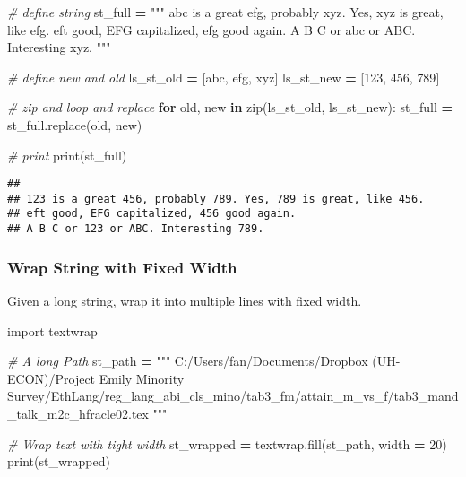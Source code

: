 \documentclass[
]{book}
\newenvironment{Shaded}{\begin{snugshade}}{\end{snugshade}}
\newcommand{\BuiltInTok}[1]{#1}
\newcommand{\CommentTok}[1]{\textcolor[rgb]{0.56,0.35,0.01}{\textit{#1}}}
\newcommand{\ControlFlowTok}[1]{\textcolor[rgb]{0.13,0.29,0.53}{\textbf{#1}}}
\newcommand{\DecValTok}[1]{\textcolor[rgb]{0.00,0.00,0.81}{#1}}
\newcommand{\ImportTok}[1]{#1}
\newcommand{\KeywordTok}[1]{\textcolor[rgb]{0.13,0.29,0.53}{\textbf{#1}}}
\newcommand{\NormalTok}[1]{#1}
\newcommand{\OperatorTok}[1]{\textcolor[rgb]{0.81,0.36,0.00}{\textbf{#1}}}
\newcommand{\StringTok}[1]{\textcolor[rgb]{0.31,0.60,0.02}{#1}}
\begin{document}
\begin{Shaded}
\begin{Highlighting}[]
\CommentTok{\# define string}
\NormalTok{st\_full }\OperatorTok{=} \StringTok{"""}
\StringTok{abc is a great efg, probably xyz. Yes, xyz is great, like efg. }
\StringTok{eft good, EFG capitalized, efg good again. }
\StringTok{A B C or abc or ABC. Interesting xyz. }
\StringTok{"""}

\CommentTok{\# define new and old}
\NormalTok{ls\_st\_old }\OperatorTok{=}\NormalTok{ [}\StringTok{\textquotesingle{}abc\textquotesingle{}}\NormalTok{, }\StringTok{\textquotesingle{}efg\textquotesingle{}}\NormalTok{, }\StringTok{\textquotesingle{}xyz\textquotesingle{}}\NormalTok{]}
\NormalTok{ls\_st\_new }\OperatorTok{=}\NormalTok{ [}\StringTok{\textquotesingle{}123\textquotesingle{}}\NormalTok{, }\StringTok{\textquotesingle{}456\textquotesingle{}}\NormalTok{, }\StringTok{\textquotesingle{}789\textquotesingle{}}\NormalTok{]}

\CommentTok{\# zip and loop and replace}
\ControlFlowTok{for}\NormalTok{ old, new }\KeywordTok{in} \BuiltInTok{zip}\NormalTok{(ls\_st\_old, ls\_st\_new):}
\NormalTok{  st\_full }\OperatorTok{=}\NormalTok{ st\_full.replace(old, new)}

\CommentTok{\# print}
\BuiltInTok{print}\NormalTok{(st\_full)}
\end{Highlighting}
\end{Shaded}

\begin{verbatim}
## 
## 123 is a great 456, probably 789. Yes, 789 is great, like 456. 
## eft good, EFG capitalized, 456 good again. 
## A B C or 123 or ABC. Interesting 789.
\end{verbatim}

\hypertarget{wrap-string-with-fixed-width}{%
\subsubsection{Wrap String with Fixed Width}\label{wrap-string-with-fixed-width}}

Given a long string, wrap it into multiple lines with fixed width.

\begin{Shaded}
\begin{Highlighting}[]
\ImportTok{import}\NormalTok{ textwrap}

\CommentTok{\# A long Path}
\NormalTok{st\_path }\OperatorTok{=} \StringTok{"""}
\StringTok{C:/Users/fan/Documents/Dropbox (UH{-}ECON)/Project Emily Minority Survey/EthLang/reg\_lang\_abi\_cls\_mino/tab3\_fm/attain\_m\_vs\_f/tab3\_mand\_talk\_m2c\_hfracle02.tex}
\StringTok{"""}

\CommentTok{\# Wrap text with tight width}
\NormalTok{st\_wrapped }\OperatorTok{=}\NormalTok{ textwrap.fill(st\_path, width }\OperatorTok{=} \DecValTok{20}\NormalTok{)}
\BuiltInTok{print}\NormalTok{(st\_wrapped)}
\end{Highlighting}
\end{Shaded}
\end{document}
